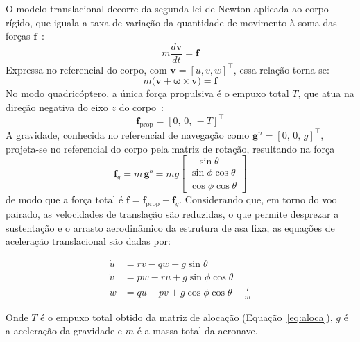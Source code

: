\documentclass{ieeeaccess}
\begin{document}
O modelo translacional decorre da segunda lei de Newton aplicada ao corpo rígido, que iguala a taxa de variação da quantidade de movimento à soma das forças $\mathbf{f}$~\cite{cBeard,c11}:
\begin{equation}
m\frac{d\mathbf{v}}{dt} = \mathbf{f}
\label{eq:trans-newton}
\end{equation}
Expressa no referencial do corpo, com $\dot{\mathbf{v}} = [\dot{u}, \dot{v}, \dot{w}]^{\top}$, essa relação torna-se:
\begin{equation}
m\big(\dot{\mathbf{v}} + \boldsymbol{\omega} \times \mathbf{v}\big) = \mathbf{f}
\label{eq:trans-compact}
\end{equation}
No modo quadricóptero, a única força propulsiva é o empuxo total $T$, que atua na direção negativa do eixo $z$ do corpo~\cite{c4}:
\begin{equation}
\mathbf{f}_{\text{prop}} = [0,\, 0,\, -T]^{\top}
\label{eq:trans-thrust}
\end{equation}
A gravidade, conhecida no referencial de navegação como $\mathbf{g}^{n}=[0,\,0,\,g]^{\top}$, projeta-se no referencial do corpo pela matriz de rotação, resultando na força
\begin{equation}
\mathbf{f}_{g} = m\,\mathbf{g}^{b} = mg\begin{bmatrix} -\sin\theta \\ \sin\phi\cos\theta \\ \cos\phi\cos\theta \end{bmatrix}
\label{eq:trans-grav}
\end{equation}
de modo que a força total é $\mathbf{f} = \mathbf{f}_{\text{prop}} + \mathbf{f}_{g}$. Considerando que, em torno do voo pairado, as velocidades de translação são reduzidas, o que permite desprezar a sustentação e o arrasto aerodinâmico da estrutura de asa fixa, as equações de aceleração translacional são dadas por:

\begin{align}
\dot{u} &= rv - qw - g\sin\theta \\
\dot{v} &= pw - ru + g\sin\phi\cos\theta \\
\dot{w} &= qu - pv + g\cos\phi\cos\theta - \frac{T}{m}
\end{align}

Onde $T$ é o empuxo total obtido da matriz de alocação (Equação~\eqref{eq:aloca}), $g$ é a aceleração da gravidade e $m$ é a massa total da aeronave.
\end{document}
